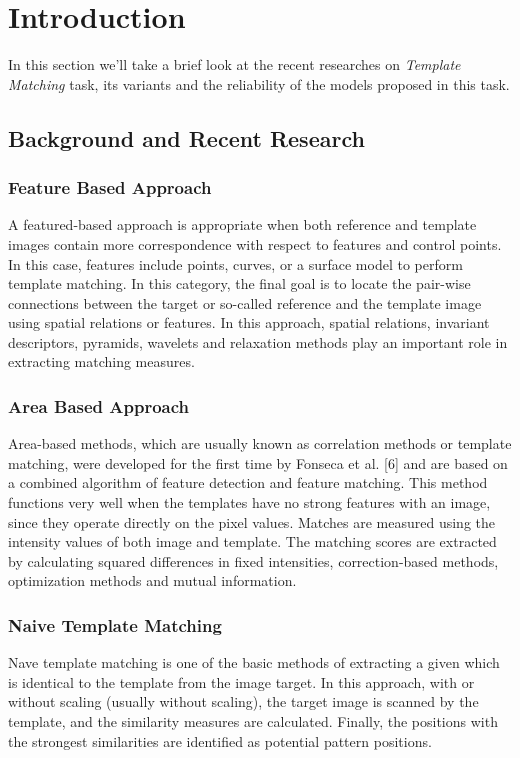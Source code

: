 \chapter{Introduction}

In this section we'll take a brief look at the recent researches on \textit{Template Matching} task, its variants and the reliability of the models proposed in this task.
\section{Background and Recent Research}

\subsection{Feature Based Approach}
A featured-based approach is appropriate when both reference
and template images contain more correspondence
with respect to features and control points. In this case,
features include points, curves, or a surface model to perform
template matching. In this category, the final goal is to locate
the pair-wise connections between the target or so-called
reference and the template image using spatial relations
or features. In this approach, spatial relations, invariant
descriptors, pyramids, wavelets and relaxation methods play
an important role in extracting matching measures\cite{abstract}.

\subsection{Area Based Approach}
Area-based methods, which are usually known as correlation
methods or template matching, were developed for the
first time by Fonseca et al. [6] and are based on a combined
algorithm of feature detection and feature matching. This
method functions very well when the templates have no
strong features with an image, since they operate directly on
the pixel values. Matches are measured using the intensity
values of both image and template. The matching scores
are extracted by calculating squared differences in fixed
intensities, correction-based methods, optimization methods
and mutual information\cite{intro1}.

\subsection{Naive Template Matching}
Nave template matching is one of the basic methods of
extracting a given which is identical to the template from
the image target. In this approach, with or without scaling
(usually without scaling), the target image is scanned by the
template, and the similarity measures are calculated. Finally,
the positions with the strongest similarities are identified as
potential pattern positions\cite{abstract}. 

